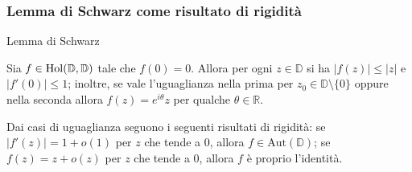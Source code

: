\begin{frame}
  \frametitle{Lemma di Schwarz come risultato di rigidità}
  \begin{block}{Lemma di Schwarz}
    \begin{itshape}
      Sia $f \in \text{\normalfont{Hol}}(\mathbb{D},\mathbb{D})$ tale che $f(0)=0$. Allora per ogni $z \in \mathbb{D}$ si ha $|f(z)| \le |z|$ e $|f'(0)| \le 1$; inoltre, se vale l'uguaglianza nella prima per $z_0 \in \mathbb{D}\setminus\{0\}$ oppure nella seconda allora $f(z)=e^{i\theta}z$ per qualche $\theta \in \mathbb{R}$.
    \end{itshape}
  \end{block}
  \pause
  \begin{oss}
    Dai casi di uguaglianza seguono i seguenti risultati di rigidità: se $|f'(z)|=1+o(1)$ per $z$ che tende a $0$, allora $f \in \text{Aut}(\mathbb{D})$; se $f(z)=z+o(z)$ per $z$ che tende a $0$, allora $f$ è proprio l'identità.
  \end{oss}
\end{frame}


